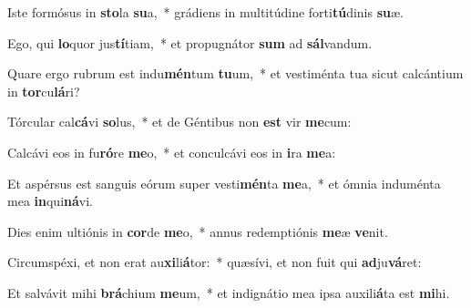 \item Iste formósus in \textbf{sto}la \textbf{su}a,~* grádiens in multitúdine forti\textbf{tú}dinis \textbf{su}æ.
\item Ego, qui \textbf{lo}quor jus\textbf{tí}tiam,~* et propugnátor \textbf{sum} ad \textbf{sál}vandum.
\item Quare ergo rubrum est indu\textbf{mén}tum \textbf{tu}um,~* et vestiménta tua sicut calcántium in \textbf{tor}cu\textbf{lá}ri?
\item Tórcular cal\textbf{cá}vi \textbf{so}lus,~* et de Géntibus non \textbf{est} vir \textbf{me}cum:
\item Calcávi eos in fu\textbf{ró}re \textbf{me}o,~* et conculcávi eos in \textbf{i}ra \textbf{me}a:
\item Et aspérsus est sanguis eórum super vesti\textbf{mén}ta \textbf{me}a,~* et ómnia induménta mea \textbf{in}qui\textbf{ná}vi.
\item Dies enim ultiónis in \textbf{cor}de \textbf{me}o,~* annus redemptiónis \textbf{me}æ \textbf{ve}nit.
\item Circumspéxi, et non erat au\textbf{xi}li\textbf{á}tor:~* quæsívi, et non fuit qui \textbf{ad}ju\textbf{vá}ret:
\item Et salvávit mihi \textbf{brá}chium \textbf{me}um,~* et indignátio mea ipsa auxili\textbf{á}ta est \textbf{mi}hi.
